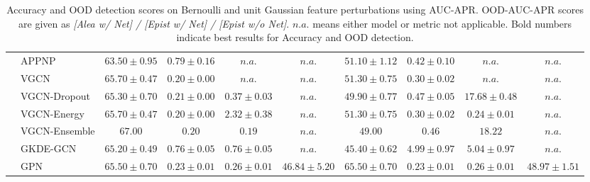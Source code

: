 \begin{table*}[!h]
{\begin{tabular}{ll|cccc|cccc}
        & APPNP & ${63.50\scriptscriptstyle \pm 0.95}$ & ${{0.79}\scriptscriptstyle \pm 0.16}$ & $n.a.$ & $n.a.$ & ${51.10\scriptscriptstyle \pm 1.12}$ & ${0.42\scriptscriptstyle \pm 0.10}$ & $n.a.$ & $n.a.$\\
        & VGCN & ${65.70\scriptscriptstyle \pm 0.47}$ & ${0.20\scriptscriptstyle \pm 0.00}$ & $n.a.$ & $n.a.$ & ${51.30\scriptscriptstyle \pm 0.75}$ & ${0.30\scriptscriptstyle \pm 0.02}$ & $n.a.$ & $n.a.$\\
        & VGCN-Dropout & ${65.30\scriptscriptstyle \pm 0.70}$ & ${0.21\scriptscriptstyle \pm 0.00}$ & ${0.37\scriptscriptstyle \pm 0.03}$ & $n.a.$ & ${49.90\scriptscriptstyle \pm 0.77}$ & ${0.47\scriptscriptstyle \pm 0.05}$ & ${17.68\scriptscriptstyle \pm 0.48}$ & $n.a.$\\
        & VGCN-Energy & ${65.70\scriptscriptstyle \pm 0.47}$ & ${0.20\scriptscriptstyle \pm 0.00}$ & ${{2.32}\scriptscriptstyle \pm 0.38}$ & $n.a.$ & ${51.30\scriptscriptstyle \pm 0.75}$ & ${0.30\scriptscriptstyle \pm 0.02}$ & ${0.24\scriptscriptstyle \pm 0.01}$ & $n.a.$\\
        & VGCN-Ensemble & ${\mathbf{67.00}}$ & ${0.20}$ & ${0.19}$ & $n.a.$ & ${49.00}$ & ${0.46}$ & ${{18.22}}$ & $n.a.$\\
        & GKDE-GCN & ${65.20\scriptscriptstyle \pm 0.49}$ & ${0.76\scriptscriptstyle \pm 0.05}$ & ${0.76\scriptscriptstyle \pm 0.05}$ & $n.a.$ & ${45.40\scriptscriptstyle \pm 0.62}$ & ${{4.99}\scriptscriptstyle \pm 0.97}$ & ${5.04\scriptscriptstyle \pm 0.97}$ & $n.a.$\\
        & GPN & ${65.50\scriptscriptstyle \pm 0.70}$ & ${0.23\scriptscriptstyle \pm 0.01}$ & ${0.26\scriptscriptstyle \pm 0.01}$ & ${\mathbf{46.84}\scriptscriptstyle \pm 5.20}$ & ${\mathbf{65.50}\scriptscriptstyle \pm 0.70}$ & ${0.23\scriptscriptstyle \pm 0.01}$ & ${0.26\scriptscriptstyle \pm 0.01}$ & ${\mathbf{48.97}\scriptscriptstyle \pm 1.51}$\\

        \bottomrule
    \end{tabular}}
    \caption{Accuracy and OOD detection scores on Bernoulli and unit Gaussian feature perturbations using AUC-APR. OOD-AUC-APR scores are given as \emph{[Alea w/ Net] / [Epist w/ Net] / [Epist w/o Net]}. $n.a.$ means either model or metric not applicable. Bold numbers indicate best results for Accuracy and  OOD detection.}
    \label{tab:isolated_apr}
\end{table*}